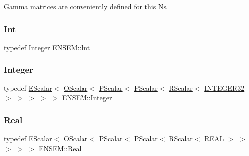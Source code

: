 Gamma matrices are conveniently defined for this Ns. 

\mbox{\label{group__defs_ga2cef3ec3b63edbe6be5af6e7be8c7f34}} 
\subsubsection{\texorpdfstring{Int}{Int}}
{\footnotesize\ttfamily typedef \mbox{\hyperlink{group__defs_gab13d060149cdd80ab40fd8d653f60117}{Integer}} \mbox{\hyperlink{group__defs_ga2cef3ec3b63edbe6be5af6e7be8c7f34}{E\+N\+S\+E\+M\+::\+Int}}}

\mbox{\label{group__defs_gab13d060149cdd80ab40fd8d653f60117}} 
\subsubsection{\texorpdfstring{Integer}{Integer}}
{\footnotesize\ttfamily typedef \mbox{\hyperlink{classENSEM_1_1EScalar}{E\+Scalar}}$<$ \mbox{\hyperlink{classENSEM_1_1OScalar}{O\+Scalar}}$<$ \mbox{\hyperlink{classENSEM_1_1PScalar}{P\+Scalar}}$<$ \mbox{\hyperlink{classENSEM_1_1PScalar}{P\+Scalar}}$<$ \mbox{\hyperlink{classENSEM_1_1RScalar}{R\+Scalar}}$<$ \mbox{\hyperlink{namespaceENSEM_a6a58e5c07422c48c5d547184b36719bf}{I\+N\+T\+E\+G\+E\+R32}} $>$ $>$ $>$ $>$ $>$ \mbox{\hyperlink{group__defs_gab13d060149cdd80ab40fd8d653f60117}{E\+N\+S\+E\+M\+::\+Integer}}}

\mbox{\label{group__defs_ga5483719647f0554b19174079436486fa}} 
\subsubsection{\texorpdfstring{Real}{Real}}
{\footnotesize\ttfamily typedef \mbox{\hyperlink{classENSEM_1_1EScalar}{E\+Scalar}}$<$ \mbox{\hyperlink{classENSEM_1_1OScalar}{O\+Scalar}}$<$ \mbox{\hyperlink{classENSEM_1_1PScalar}{P\+Scalar}}$<$ \mbox{\hyperlink{classENSEM_1_1PScalar}{P\+Scalar}}$<$ \mbox{\hyperlink{classENSEM_1_1RScalar}{R\+Scalar}}$<$ \mbox{\hyperlink{namespaceENSEM_a6dd9aa6508168f545c861787e63ddd1e}{R\+E\+AL}} $>$ $>$ $>$ $>$ $>$ \mbox{\hyperlink{group__defs_ga5483719647f0554b19174079436486fa}{E\+N\+S\+E\+M\+::\+Real}}}

